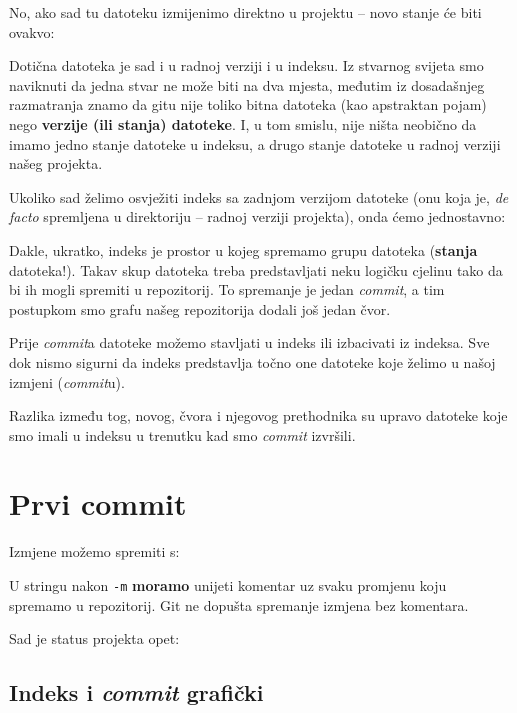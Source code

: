 No, ako sad tu datoteku izmijenimo direktno u projektu -- novo stanje će biti ovakvo:



Dotična datoteka je sad i u radnoj verziji i u indeksu.
Iz stvarnog svijeta smo naviknuti da jedna stvar ne može biti na dva mjesta, međutim iz dosadašnjeg razmatranja znamo da gitu nije toliko bitna datoteka (kao apstraktan pojam) nego \textbf{verzije (ili stanja) datoteke}.
I, u tom smislu, nije ništa neobično da imamo jedno stanje datoteke u indeksu, a drugo stanje datoteke u radnoj verziji našeg projekta.

Ukoliko sad želimo osvježiti indeks sa zadnjom verzijom datoteke (onu koja je, \emph{de facto} spremljena u direktoriju -- radnoj verziji projekta), onda ćemo jednostavno:


Dakle, ukratko, indeks je prostor u kojeg spremamo grupu datoteka (\textbf{stanja} datoteka!).
Takav skup datoteka treba predstavljati neku logičku cjelinu tako da bi ih mogli spremiti u repozitorij.
To spremanje je jedan \emph{commit}, a tim postupkom smo grafu našeg repozitorija dodali još jedan čvor. 

Prije \emph{commit}a datoteke možemo stavljati u indeks ili izbacivati iz indeksa.
Sve dok nismo sigurni da indeks predstavlja točno one datoteke koje želimo u našoj izmjeni (\emph{commit}u).

Razlika između tog, novog, čvora i njegovog prethodnika su upravo datoteke koje smo imali u indeksu u trenutku kad smo \emph{commit} izvršili.

\section*{Prvi commit}

Izmjene možemo spremiti s:


U stringu nakon \verb+-m+ \textbf{moramo} unijeti komentar uz svaku promjenu koju spremamo u repozitorij.
Git ne dopušta spremanje izmjena bez komentara.

Sad je status projekta opet:



\subsection*{Indeks i \emph{commit} grafički}

